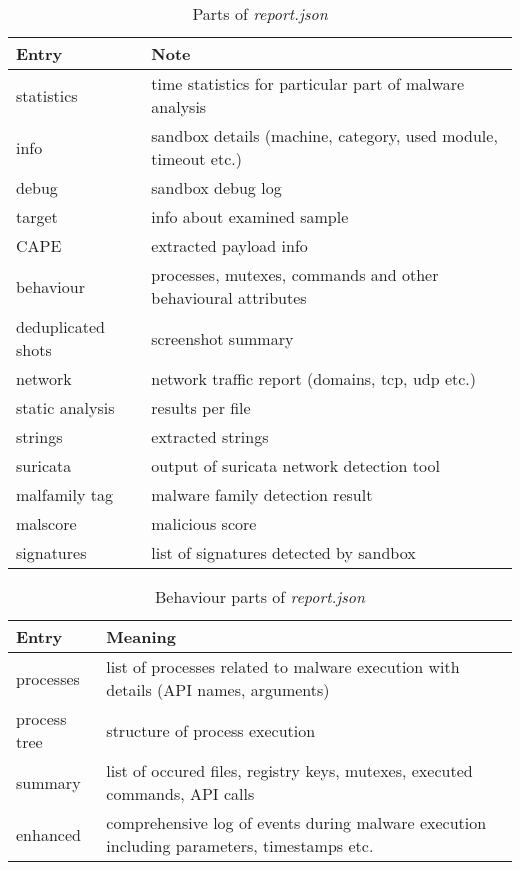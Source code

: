   \begin{table}[h]
    \centering
    \caption{Parts of \emph{report.json}}
    \begin{tabular}{p{4cm}p{10cm}} 
        \toprule
        \textbf{Entry} &
        \textbf{Note} \\
        \midrule
        statistics & time statistics for particular part of malware analysis \\
        \midrule
        info & sandbox details (machine, category, used module, timeout etc.) \\
        \midrule
        debug & sandbox debug log \\
        \midrule
        target &  info about examined sample\\
        \midrule
        CAPE & extracted payload info \\
        \midrule
        behaviour & processes, mutexes, commands and other behavioural attributes \\
        \midrule
        deduplicated shots & screenshot summary \\
        \midrule
        network & network traffic report (domains, tcp, udp etc.) \\
        \midrule
        static analysis & results per file \\
        \midrule
        strings & extracted strings \\
        \midrule
        suricata &  output of suricata network detection tool \\
        \midrule
        malfamily tag &  malware family detection result\\
        \midrule
        malscore &  malicious score\\
        \midrule
        signatures &  list of signatures detected by sandbox \\
        \bottomrule
    \end{tabular}
    \label{tab:report}
  \end{table}

  \begin{table}[h]
    \centering
    \caption{Behaviour parts of \emph{report.json}}
    \begin{tabular}{p{2cm}p{12cm}} 
        \toprule
        \textbf{Entry} &
        \textbf{Meaning} \\
        \midrule
        processes & list of processes related to malware execution with details (API names, arguments) \\
        \midrule
        process tree & structure of process execution\\
        \midrule
        summary & list of occured files, registry keys, mutexes, executed commands, API calls \\
        \midrule
        enhanced & comprehensive log of events during malware execution including parameters, timestamps etc.\\
        \bottomrule
    \end{tabular}
    \label{tab:behavioral}
\end{table}